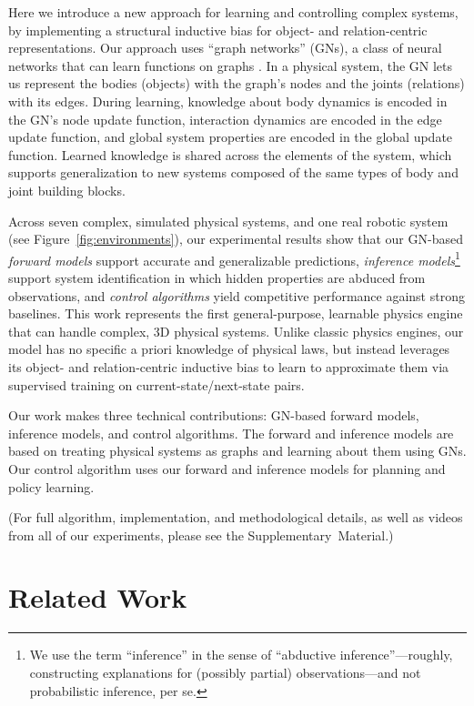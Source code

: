 \documentclass{article}
\begin{document}
Here we introduce a new approach for learning and controlling complex systems, by implementing a structural inductive bias for object- and relation-centric representations.
%
Our approach uses ``graph networks'' (GNs), a class of neural networks that can learn functions on graphs  \cite{scarselli2009graph,li2015gated,battaglia2016interaction,gilmer2017neural}. 
In a physical system, the GN lets us represent the bodies (objects) with the graph's nodes and the joints (relations) with its edges. During learning, knowledge about body dynamics is encoded in the GN's node update function, interaction dynamics are encoded in the edge update function, and global system properties are encoded in the global update function. Learned knowledge is shared across the elements of the system, which supports generalization to new systems composed of the same types of body and joint building blocks. 

Across seven complex, simulated physical systems, and one real robotic system (see Figure~\ref{fig:environments}), our experimental results show that our GN-based \emph{forward models} support accurate and generalizable predictions, \emph{inference models}\footnote{We use the term ``inference'' in the sense of ``abductive inference''---roughly, constructing explanations for (possibly partial) observations---and not probabilistic inference, per se.} support system identification in which hidden properties are abduced from observations, and \emph{control algorithms} yield competitive performance against strong baselines. This work represents the first general-purpose, learnable physics engine that can handle complex, 3D physical systems. Unlike classic physics engines, our model has no specific a priori knowledge of physical laws, but instead leverages its object- and relation-centric inductive bias to learn to approximate them via supervised training on current-state/next-state pairs. 

Our work makes three technical contributions: GN-based forward models, inference models, and control algorithms. The forward and inference models are based on treating physical systems as graphs and learning about them using GNs. Our control algorithm uses our forward and inference models for planning and policy learning.

(For full algorithm, implementation, and methodological details, as well as videos from all of our experiments, please see the Supplementary~Material.)


\section{Related Work}
\end{document}
